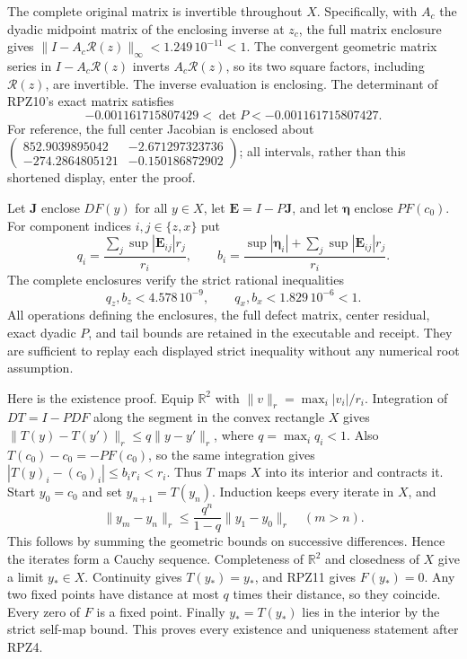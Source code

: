 \documentclass[11pt]{article}
\begin{document}
The complete original matrix is invertible throughout $X$.
Specifically, with $A_c$ the dyadic midpoint matrix of the enclosing
inverse at $z_c$, the full matrix enclosure gives
$\|I-A_c\mathcal R(z)\|_\infty<1.249\,10^{-11}<1$.
The convergent geometric matrix series in $I-A_c\mathcal R(z)$
inverts $A_c\mathcal R(z)$, so its two square factors, including
$\mathcal R(z)$, are invertible. The inverse evaluation is enclosing.
The determinant of RPZ10's exact matrix satisfies
\[
 -0.001161715807429<\det P<-0.001161715807427 .\tag{RPZ11}
\]
For reference, the full center Jacobian is enclosed about
$\left(\begin{smallmatrix}852.9039895042&-2.671297323736\\
-274.2864805121&-0.150186872902\end{smallmatrix}\right)$;
all intervals, rather than this shortened display, enter the proof.

Let $\boldsymbol J$ enclose $DF(y)$ for all $y\in X$, let
$\boldsymbol E=I-P\boldsymbol J$, and let $\boldsymbol\eta$
enclose $PF(c_0)$. For component indices $i,j\in\{z,x\}$ put
\[
 q_i=\frac{\sum_j\sup|\boldsymbol E_{ij}|r_j}{r_i},\qquad
 b_i=\frac{\sup|\boldsymbol\eta_i|
                    +\sum_j\sup|\boldsymbol E_{ij}|r_j}{r_i}.
 \tag{RPZ12}
\]
The complete enclosures verify the strict rational inequalities
\[
 q_z,b_z<4.578\,10^{-9},\qquad
 q_x,b_x<1.829\,10^{-6}<1.\tag{RPZ13}
\]
All operations defining the enclosures, the full defect matrix,
center residual, exact dyadic $P$, and tail bounds are retained in
the executable and receipt. They are sufficient to replay each
displayed strict inequality without any numerical root assumption.

Here is the existence proof. Equip $\mathbb R^2$ with
$\|v\|_r=\max_i|v_i|/r_i$. Integration of $DT=I-PDF$ along the
segment in the convex rectangle $X$ gives
$\|T(y)-T(y')\|_r\le q\|y-y'\|_r$, where
$q=\max_iq_i<1$. Also
$T(c_0)-c_0=-PF(c_0)$, so the same integration gives
$|T(y)_i-(c_0)_i|\le b_ir_i<r_i$.
Thus $T$ maps $X$ into its interior and contracts it.
Start $y_0=c_0$ and set $y_{n+1}=T(y_n)$. Induction keeps every
iterate in $X$, and
\[
 \|y_m-y_n\|_r\le
 \frac{q^n}{1-q}\|y_1-y_0\|_r\quad(m>n).\tag{RPZ14}
\]
This follows by summing the geometric bounds on successive
differences. Hence the iterates form a Cauchy sequence. Completeness
of $\mathbb R^2$ and closedness of $X$ give a limit $y_*\in X$.
Continuity gives $T(y_*)=y_*$, and RPZ11 gives $F(y_*)=0$.
Any two fixed points have distance at most $q$ times their distance,
so they coincide. Every zero of $F$ is a fixed point. Finally
$y_*=T(y_*)$ lies in the interior by the strict self-map bound.
This proves every existence and uniqueness statement after RPZ4.
\end{document}
